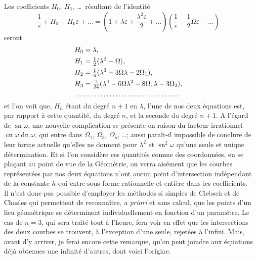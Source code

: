 \documentclass[11pt,leqno,oneside,letterpaper]{book}[2005/09/16]
\DeclareMathOperator{\sn}{sn}
\DeclareMathOperator{\cn}{cn}
\DeclareMathOperator{\dn}{dn}
\newcommand{\dotfillalign}{\multispan{2}{\dotfill}}
\begin{document}
Les coefficients $H_0$, $H_1$, \ldots\ r\'esultant de l'identit\'e
\[
\frac{1}{\varepsilon} + H_0 + H_0\varepsilon + \ldots =
  \left( 1+\lambda\varepsilon + \frac{\lambda^2\varepsilon}{2} + \ldots\right)
  \left( \frac{1}{\varepsilon}-\frac{1}{2}\Omega\varepsilon - \ldots\right)
\]
seront
\begin{align*}
H_0 &= \lambda, \\
H_1 &= \tfrac{1}{2}(\lambda^2 - \Omega), \\
H_2 &= \tfrac{1}{6}(\lambda^3 - 3\Omega\lambda - 2\Omega_1), \\
H_3 &= \tfrac{1}{24}(\lambda^4 - 6\Omega\lambda^2 - 8\Omega_1\lambda - 3\Omega_2), \\
\dotfillalign
\end{align*}
et l'on voit que, $H_n$ \'etant du degr\'e $n+1$ en $\lambda$, l'une de nos deux \'equations
est, par rapport \`a cette quantit\'e, du degr\'e $n$, et la seconde du degr\'e $n+1$.
A l'\'egard de $\sn\omega$, une nouvelle complication se pr\'esente en raison du
facteur irrationnel $\cn\omega\dn\omega$, qui entre dans $\Omega_1$, $\Omega_3$, $\Omega_5$, \ldots; aussi para\^it-il
impossible de conclure de leur forme actuelle qu'elles ne donnent
pour $\lambda^2$ et $\sn^2\omega$ qu'une seule et unique d\'etermination. Et si l'on consid\`ere
ces quantit\'es comme des coordonn\'ees, en se pla\c{c}ant au point de
vue de la G\'eom\'etrie, on verra ais\'ement que les courbes repr\'esent\'ees par
nos deux \'equations n'ont aucun point d'intersection ind\'ependant de la
constante $h$ qui entre sous forme rationnelle et enti\`ere dans les coefficients.
Il n'est donc pas possible d'employer les m\'ethodes si simples de
Clebsch et de Chasles qui permettent de reconna\^itre, \emph{a priori} et sans calcul,
que les points d'un lieu g\'eom\'etrique se d\'eterminent individuellement en
fonction d'un param\`etre. Le cas de $n = 3$, qui sera trait\'e tout \`a l'heure,
fera voir en effet que les intersections des deux courbes se trouvent, \`a
l'exception d'une seule, rejet\'ees \`a l'infini. Mais, avant d'y arriver, je ferai
encore cette remarque, qu'on peut joindre aux \'equations d\'ej\`a obtenues
une infinit\'e d'autres, dont voici l'origine.
\end{document}
